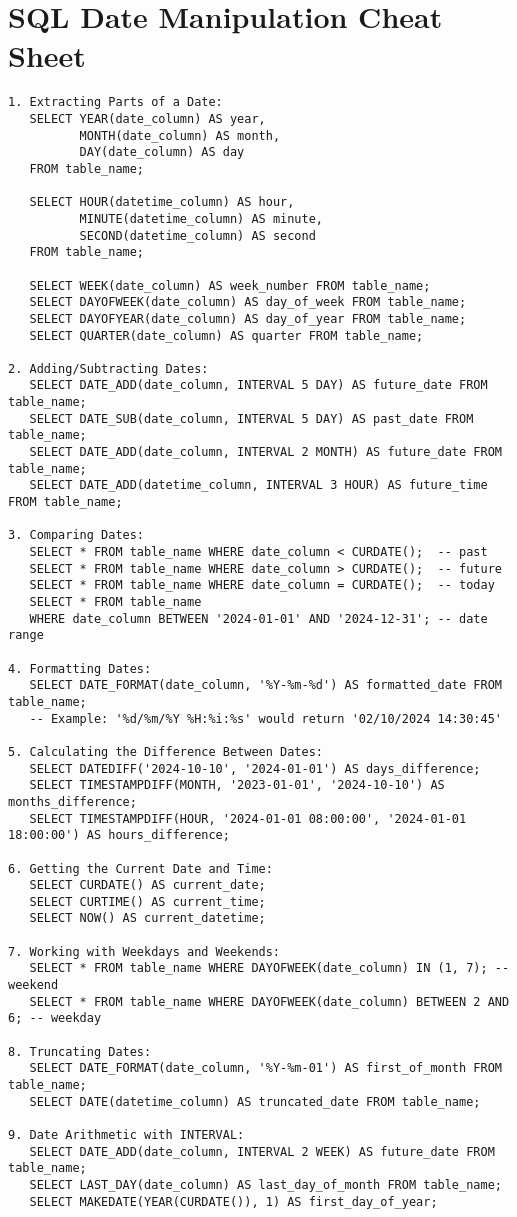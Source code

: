 \documentclass{article}
\begin{document}
\section*{SQL Date Manipulation Cheat Sheet}

\begin{lstlisting}
1. Extracting Parts of a Date:
   SELECT YEAR(date_column) AS year,
          MONTH(date_column) AS month,
          DAY(date_column) AS day
   FROM table_name;

   SELECT HOUR(datetime_column) AS hour,
          MINUTE(datetime_column) AS minute,
          SECOND(datetime_column) AS second
   FROM table_name;

   SELECT WEEK(date_column) AS week_number FROM table_name;
   SELECT DAYOFWEEK(date_column) AS day_of_week FROM table_name;
   SELECT DAYOFYEAR(date_column) AS day_of_year FROM table_name;
   SELECT QUARTER(date_column) AS quarter FROM table_name;

2. Adding/Subtracting Dates:
   SELECT DATE_ADD(date_column, INTERVAL 5 DAY) AS future_date FROM table_name;
   SELECT DATE_SUB(date_column, INTERVAL 5 DAY) AS past_date FROM table_name;
   SELECT DATE_ADD(date_column, INTERVAL 2 MONTH) AS future_date FROM table_name;
   SELECT DATE_ADD(datetime_column, INTERVAL 3 HOUR) AS future_time FROM table_name;

3. Comparing Dates:
   SELECT * FROM table_name WHERE date_column < CURDATE();  -- past
   SELECT * FROM table_name WHERE date_column > CURDATE();  -- future
   SELECT * FROM table_name WHERE date_column = CURDATE();  -- today
   SELECT * FROM table_name 
   WHERE date_column BETWEEN '2024-01-01' AND '2024-12-31'; -- date range

4. Formatting Dates:
   SELECT DATE_FORMAT(date_column, '%Y-%m-%d') AS formatted_date FROM table_name;
   -- Example: '%d/%m/%Y %H:%i:%s' would return '02/10/2024 14:30:45'

5. Calculating the Difference Between Dates:
   SELECT DATEDIFF('2024-10-10', '2024-01-01') AS days_difference;
   SELECT TIMESTAMPDIFF(MONTH, '2023-01-01', '2024-10-10') AS months_difference;
   SELECT TIMESTAMPDIFF(HOUR, '2024-01-01 08:00:00', '2024-01-01 18:00:00') AS hours_difference;

6. Getting the Current Date and Time:
   SELECT CURDATE() AS current_date;
   SELECT CURTIME() AS current_time;
   SELECT NOW() AS current_datetime;

7. Working with Weekdays and Weekends:
   SELECT * FROM table_name WHERE DAYOFWEEK(date_column) IN (1, 7); -- weekend
   SELECT * FROM table_name WHERE DAYOFWEEK(date_column) BETWEEN 2 AND 6; -- weekday

8. Truncating Dates:
   SELECT DATE_FORMAT(date_column, '%Y-%m-01') AS first_of_month FROM table_name;
   SELECT DATE(datetime_column) AS truncated_date FROM table_name;

9. Date Arithmetic with INTERVAL:
   SELECT DATE_ADD(date_column, INTERVAL 2 WEEK) AS future_date FROM table_name;
   SELECT LAST_DAY(date_column) AS last_day_of_month FROM table_name;
   SELECT MAKEDATE(YEAR(CURDATE()), 1) AS first_day_of_year;
\end{lstlisting}
\end{document}
